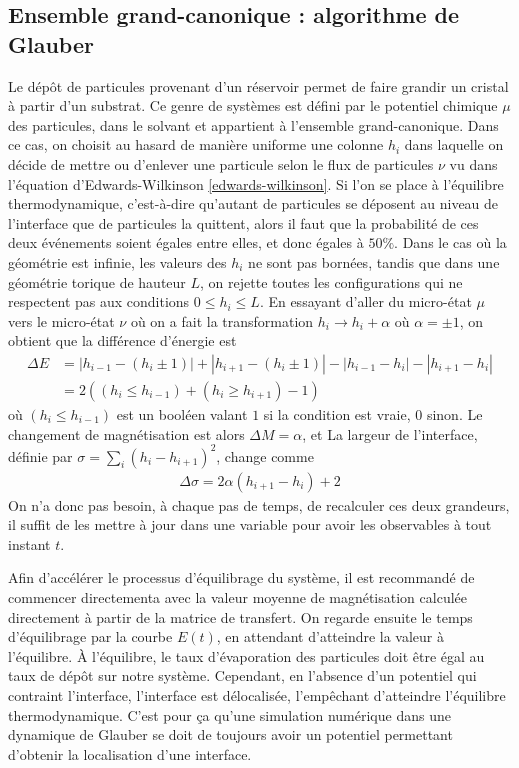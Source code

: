 	\subsection{Ensemble grand-canonique : algorithme de Glauber}
Le dépôt de particules provenant d'un réservoir permet de faire grandir un cristal à partir d'un substrat. Ce genre de systèmes est défini par le potentiel chimique $\mu$ des particules, dans le solvant et appartient à l'ensemble grand-canonique. Dans ce cas, on choisit au hasard de manière uniforme une colonne $h_i$ dans laquelle on décide de mettre ou d'enlever une particule selon le flux de particules $\nu$ vu dans l'équation d'Edwards-Wilkinson \ref{edwards-wilkinson}. Si l'on se place à l'équilibre thermodynamique, c'est-à-dire qu'autant de particules se déposent au niveau de l'interface que de particules la quittent, alors il faut que la probabilité de ces deux événements soient égales entre elles, et donc égales à $50\%$.
Dans le cas où la géométrie est infinie, les valeurs des $h_i$ ne sont pas bornées, tandis que dans une géométrie torique de hauteur $L$, on rejette toutes les configurations qui ne respectent pas aux conditions $0 \leq h_i \leq L$.
En essayant d'aller du micro-état $\mu$ vers le micro-état $\nu$ où on a fait la transformation $h_i \rightarrow h_i + \alpha$ où $\alpha=\pm 1$, on obtient que la différence d'énergie est
\begin{align}
	\Delta E &= |h_{i-1}-(h_i \pm 1)| + |h_{i+1}-(h_i \pm 1)| - |h_{i-1}-h_i| - |h_{i+1}-h_i|  \\
		&= 2 \left( (h_i \leq h_{i-1}) + (h_i \geq h_{i+1}) -1 \right )
\end{align}
où $(h_i \leq h_{i-1})$ est un booléen valant $1$ si la condition est vraie, $0$ sinon.
Le changement de magnétisation est alors $\Delta M = \alpha$, et La largeur de l'interface, définie par $\sigma = \sum_i (h_i-h_{i+1})^2$, change comme
\begin{align}
	\Delta \sigma = 2 \alpha (h_{i+1}-h_i) + 2
\end{align}
On n'a donc pas besoin, à chaque pas de temps, de recalculer ces deux grandeurs, il suffit de les mettre à jour dans une variable pour avoir les observables à tout instant $t$.

Afin d'accélérer le processus d'équilibrage du système, il est recommandé de commencer directementa avec la valeur moyenne de magnétisation calculée directement à partir de la matrice de transfert. On regarde ensuite le temps d'équilibrage par la courbe $E(t)$, en attendant d'atteindre la valeur à l'équilibre. 
À l'équilibre, le taux d'évaporation des particules doit être égal au taux de dépôt sur notre système. Cependant, en l'absence d'un potentiel qui contraint l'interface, l'interface est délocalisée, l'empêchant d'atteindre l'équilibre thermodynamique. C'est pour ça qu'une simulation numérique dans une dynamique de Glauber se doit de toujours avoir un potentiel permettant d'obtenir la localisation d'une interface. 

